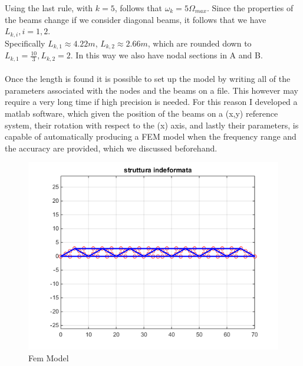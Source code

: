 \documentclass[10pt,a4paper,final]{report}
\begin{document}
Using the last rule, with $k=5$, follows that $\omega_{k} =5 \Omega_{max}$. Since the properties of the beams change if we consider diagonal beams, it follows that we have $L_{k,i}, i=1,2$. \\ Specifically $L_{k,1} \approx 4.22 m$, $L_{k,2} \approx 2.66 m$, which are rounded down to \\ $L_{k,1} = \frac{10}{3}, L_{k,2}=2$. In this way we also have nodal sections in A and B.
\\ \\
Once the length is found it is possible to set up the model by writing all of the parameters associated with the nodes and the beams on a file. This however may require a very long time if high precision is needed. For this reason I developed a matlab software, which given the position of the beams on a (x,y) reference system, their rotation with respect to the (x) axis, and lastly their parameters, is capable of automatically producing a FEM model when the frequency range and the accuracy are provided, which we discussed beforehand.


\begin{figure}
  \begin{center}
    \includegraphics[scale=0.4]{undeformed_structure}
  \end{center}
  \label{fig:femmodel}
  \caption{Fem Model}
\end{figure}
\end{document}
